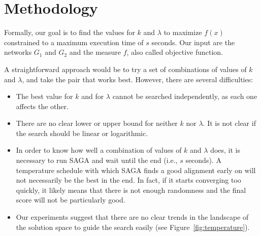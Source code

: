 \documentclass[]{article}
\begin{document}
\section{Methodology}

Formally, our goal is to find the values for $k$ and $\lambda$ to maximize $f(x)$ constrained to a maximum execution time of $s$ seconds. Our input are the networks $G_1$ and $G_2$ and the measure $f$, also called objective function.

A straightforward approach would be to try a set of combinations of values of $k$ and $\lambda$, and take the pair that works best. However, there are several difficulties:
\begin{itemize}
\item The best value for $k$ and for $\lambda$ cannot be searched independently, as each one affects the other.
\item There are no clear lower or upper bound for neither $k$ nor $\lambda$. It is not clear if the search should be linear or logarithmic.
\item In order to know how well a combination of values of $k$ and $\lambda$ does, it is necessary to run SAGA and wait until the end (i.e., $s$ seconds). A temperature schedule with which SAGA finds a good alignment early on will not necessarily be the best in the end. In fact, if it starts converging too quickly, it likely means that there is not enough randomness and the final score will not be particularly good.
\item Our experiments suggest that there are no clear trends in the landscape of the solution space to guide the search easily (see Figure~\ref{fig:temperature}).
\end{itemize}
\end{document}
